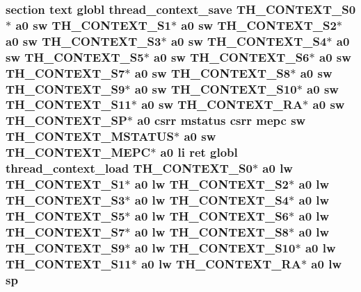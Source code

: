 \hypertarget{riscv_2threada_8S_acea2af8875359fa98f1fb546c9c788d9}{
\subsubsection[{sp}]{\setlength{\rightskip}{0pt plus 5cm}section text globl {\bf thread\-\_\-context\-\_\-save} {\bf T\-H\-\_\-\-C\-O\-N\-T\-E\-X\-T\-\_\-\-S0}$\ast$ {\bf a0} {\bf sw} {\bf T\-H\-\_\-\-C\-O\-N\-T\-E\-X\-T\-\_\-\-S1}$\ast$ {\bf a0} {\bf sw} {\bf T\-H\-\_\-\-C\-O\-N\-T\-E\-X\-T\-\_\-\-S2}$\ast$ {\bf a0} {\bf sw} {\bf T\-H\-\_\-\-C\-O\-N\-T\-E\-X\-T\-\_\-\-S3}$\ast$ {\bf a0} {\bf sw} {\bf T\-H\-\_\-\-C\-O\-N\-T\-E\-X\-T\-\_\-\-S4}$\ast$ {\bf a0} {\bf sw} {\bf T\-H\-\_\-\-C\-O\-N\-T\-E\-X\-T\-\_\-\-S5}$\ast$ {\bf a0} {\bf sw} {\bf T\-H\-\_\-\-C\-O\-N\-T\-E\-X\-T\-\_\-\-S6}$\ast$ {\bf a0} {\bf sw} {\bf T\-H\-\_\-\-C\-O\-N\-T\-E\-X\-T\-\_\-\-S7}$\ast$ {\bf a0} {\bf sw} {\bf T\-H\-\_\-\-C\-O\-N\-T\-E\-X\-T\-\_\-\-S8}$\ast$ {\bf a0} {\bf sw} {\bf T\-H\-\_\-\-C\-O\-N\-T\-E\-X\-T\-\_\-\-S9}$\ast$ {\bf a0} {\bf sw} {\bf T\-H\-\_\-\-C\-O\-N\-T\-E\-X\-T\-\_\-\-S10}$\ast$ {\bf a0} {\bf sw} {\bf T\-H\-\_\-\-C\-O\-N\-T\-E\-X\-T\-\_\-\-S11}$\ast$ {\bf a0} {\bf sw} {\bf T\-H\-\_\-\-C\-O\-N\-T\-E\-X\-T\-\_\-\-R\-A}$\ast$ {\bf a0} {\bf sw} {\bf T\-H\-\_\-\-C\-O\-N\-T\-E\-X\-T\-\_\-\-S\-P}$\ast$ {\bf a0} csrr {\bf mstatus} csrr {\bf mepc} {\bf sw} {\bf T\-H\-\_\-\-C\-O\-N\-T\-E\-X\-T\-\_\-\-M\-S\-T\-A\-T\-U\-S}$\ast$ {\bf a0} {\bf sw} {\bf T\-H\-\_\-\-C\-O\-N\-T\-E\-X\-T\-\_\-\-M\-E\-P\-C}$\ast$ {\bf a0} {\bf li} ret globl {\bf thread\-\_\-context\-\_\-load} {\bf T\-H\-\_\-\-C\-O\-N\-T\-E\-X\-T\-\_\-\-S0}$\ast$ {\bf a0} {\bf lw} {\bf T\-H\-\_\-\-C\-O\-N\-T\-E\-X\-T\-\_\-\-S1}$\ast$ {\bf a0} {\bf lw} {\bf T\-H\-\_\-\-C\-O\-N\-T\-E\-X\-T\-\_\-\-S2}$\ast$ {\bf a0} {\bf lw} {\bf T\-H\-\_\-\-C\-O\-N\-T\-E\-X\-T\-\_\-\-S3}$\ast$ {\bf a0} {\bf lw} {\bf T\-H\-\_\-\-C\-O\-N\-T\-E\-X\-T\-\_\-\-S4}$\ast$ {\bf a0} {\bf lw} {\bf T\-H\-\_\-\-C\-O\-N\-T\-E\-X\-T\-\_\-\-S5}$\ast$ {\bf a0} {\bf lw} {\bf T\-H\-\_\-\-C\-O\-N\-T\-E\-X\-T\-\_\-\-S6}$\ast$ {\bf a0} {\bf lw} {\bf T\-H\-\_\-\-C\-O\-N\-T\-E\-X\-T\-\_\-\-S7}$\ast$ {\bf a0} {\bf lw} {\bf T\-H\-\_\-\-C\-O\-N\-T\-E\-X\-T\-\_\-\-S8}$\ast$ {\bf a0} {\bf lw} {\bf T\-H\-\_\-\-C\-O\-N\-T\-E\-X\-T\-\_\-\-S9}$\ast$ {\bf a0} {\bf lw} {\bf T\-H\-\_\-\-C\-O\-N\-T\-E\-X\-T\-\_\-\-S10}$\ast$ {\bf a0} {\bf lw} {\bf T\-H\-\_\-\-C\-O\-N\-T\-E\-X\-T\-\_\-\-S11}$\ast$ {\bf a0} {\bf lw} {\bf T\-H\-\_\-\-C\-O\-N\-T\-E\-X\-T\-\_\-\-R\-A}$\ast$ {\bf a0} {\bf lw} sp}}\label{riscv_2threada_8S_acea2af8875359fa98f1fb546c9c788d9}

